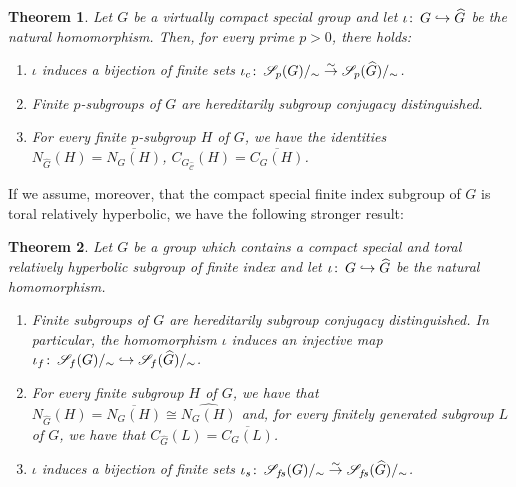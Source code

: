 \documentclass[12pt,twoside]{amsart}
\newcommand\hookra{\hookrightarrow}
\newcommand\sr{\stackrel}
\newcommand\ol{\overline}
\newcommand\cC{{\mathscr C}}
\newcommand\cS{{\mathscr S}}
\newcommand\wh{\widehat}
\def\co{\colon\thinspace}
\def\wC{{\widehat{\cC}}}
\newtheorem{theorem}{Theorem}[section]
\theoremstyle{definition}
\begin{document}


\begin{theorem}\label{virtually compact special} Let $G$ be a virtually compact special group and let $\iota\co G\hookra\wh{G}$ be the
natural homomorphism. Then, for every prime $p>0$, there holds:
\begin{enumerate}
\item $\iota$ induces a bijection of finite sets $\iota_c\co\cS_p(G)/_{\sim}\sr{\sim}{\to}\cS_p(\widehat G)/_{\sim}$.  
\item Finite $p$-subgroups  of $G$ are hereditarily subgroup conjugacy distinguished.
\item For every finite $p$-subgroup $H$ of $G$, we have the identities $N_{\widehat G}(H)=\ol{N_G(H)}$, $C_{G_\wC}(H)=\ol{C_G(H)}$.
\end{enumerate}
\end{theorem} 

If we assume, moreover, that the compact special finite index subgroup of $G$ is toral relatively hyperbolic, 
we have the following stronger result:

\begin{theorem}\label{GVCSHRNRH}Let $G$ be a group which contains a compact special and toral relatively hyperbolic subgroup of finite index
and let $\iota\co G\hookra\wh{G}$ be the natural homomorphism.
\begin{enumerate}
\item Finite subgroups  of $G$ are hereditarily subgroup conjugacy distinguished. In particular, the homomorphism
$\iota$ induces an injective map $\iota_f\co\cS_f(G)/_{\sim}\hookra\cS_f(\widehat G)/_{\sim}$.
\item For every finite subgroup $H$ of $G$, we have that $N_{\widehat G}(H)=\ol{N_G(H)}\cong\wh{N_G(H)}$ and, 
for every finitely generated subgroup $L$ of $G$, we have that $C_{\widehat G}(L)=\ol{C_G(L)}$.
\item $\iota$ induces a bijection of finite sets $\iota_s\co\cS_{f\!s}(G)/_{\sim}\sr{\sim}{\to}\cS_{f\!s}(\widehat G)/_{\sim}$.  
\end{enumerate}
\end{theorem}
\end{document}
